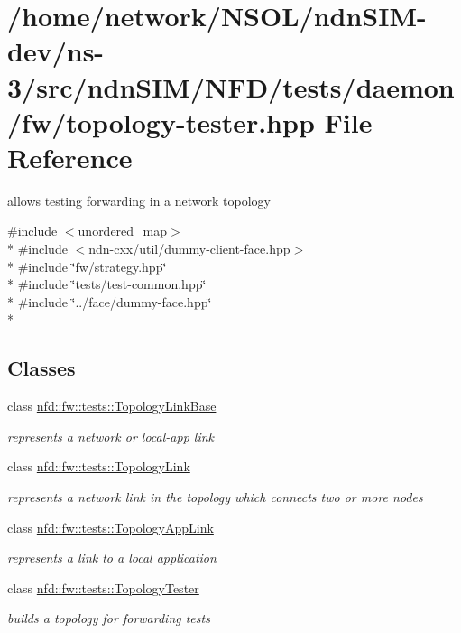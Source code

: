 \hypertarget{topology-tester_8hpp}{}\section{/home/network/\+N\+S\+O\+L/ndn\+S\+I\+M-\/dev/ns-\/3/src/ndn\+S\+I\+M/\+N\+F\+D/tests/daemon/fw/topology-\/tester.hpp File Reference}
\label{topology-tester_8hpp}


allows testing forwarding in a network topology  


{\ttfamily \#include $<$unordered\+\_\+map$>$}\\*
{\ttfamily \#include $<$ndn-\/cxx/util/dummy-\/client-\/face.\+hpp$>$}\\*
{\ttfamily \#include \char`\"{}fw/strategy.\+hpp\char`\"{}}\\*
{\ttfamily \#include \char`\"{}tests/test-\/common.\+hpp\char`\"{}}\\*
{\ttfamily \#include \char`\"{}../face/dummy-\/face.\+hpp\char`\"{}}\\*
\subsection*{Classes}
\begin{DoxyCompactItemize}
\item 
class \hyperlink{classnfd_1_1fw_1_1tests_1_1TopologyLinkBase}{nfd\+::fw\+::tests\+::\+Topology\+Link\+Base}
\begin{DoxyCompactList}\small\item\em represents a network or local-\/app link \end{DoxyCompactList}\item 
class \hyperlink{classnfd_1_1fw_1_1tests_1_1TopologyLink}{nfd\+::fw\+::tests\+::\+Topology\+Link}
\begin{DoxyCompactList}\small\item\em represents a network link in the topology which connects two or more nodes \end{DoxyCompactList}\item 
class \hyperlink{classnfd_1_1fw_1_1tests_1_1TopologyAppLink}{nfd\+::fw\+::tests\+::\+Topology\+App\+Link}
\begin{DoxyCompactList}\small\item\em represents a link to a local application \end{DoxyCompactList}\item 
class \hyperlink{classnfd_1_1fw_1_1tests_1_1TopologyTester}{nfd\+::fw\+::tests\+::\+Topology\+Tester}
\begin{DoxyCompactList}\small\item\em builds a topology for forwarding tests \end{DoxyCompactList}\end{DoxyCompactItemize}
